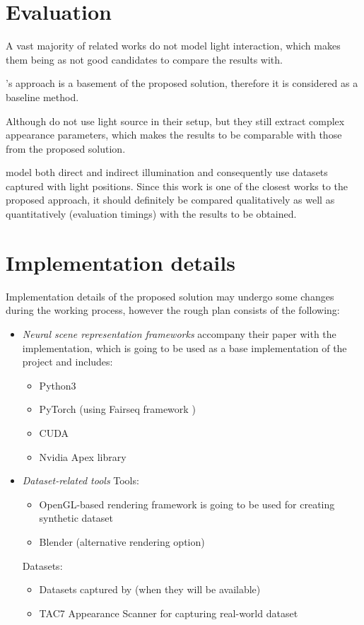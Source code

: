 \documentclass[english]{article}
\begin{document}
\section{Evaluation}
\label{evaluation}

A vast majority of related works do not model light interaction, which makes them being as not good candidates to compare the results with.

\cite{nrf2020}'s approach is a basement of the proposed solution, therefore it is considered as a baseline method.

Although \cite{boss2020nerd} do not use light source in their setup, but they still extract complex appearance parameters, which makes the results to be comparable with those from the proposed solution.

\cite{srinivasan2020nerv} model both direct and indirect illumination and consequently use datasets captured with light positions. Since this work is one of the closest works to the proposed approach, it should definitely be compared qualitatively as well as quantitatively (evaluation timings) with the results to be obtained.

\section{Implementation details}

Implementation details of the proposed solution may undergo some changes during the working process, however the rough plan consists of the following:
\begin{itemize}
    \item \textit{Neural scene representation frameworks}
    \cite{nsvf2020} accompany their paper with the implementation, which is going to be used as a base implementation of the project and includes:
    \begin{itemize}
        \item Python3
        \item PyTorch (using Fairseq framework \cite{ott2019fairseq})
        \item CUDA
        \item Nvidia Apex library
    \end{itemize}
    
    \item \textit{Dataset-related tools}
    Tools:
    \begin{itemize}
        \item OpenGL-based rendering framework \cite{thies2019deferred} is going to be used for creating synthetic dataset
        \item Blender (alternative rendering option)
    \end{itemize}
    Datasets:
    \begin{itemize}
        \item Datasets captured by \cite{nrf2020} (when they will be available)
        \item TAC7 Appearance Scanner \cite{tac7} for capturing real-world dataset
    \end{itemize}
\end{itemize}
\end{document}
